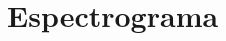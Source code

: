 \documentclass[assd_tp2_main.tex]{subfiles}
\begin{document}
\section{Espectrograma}
\end{document}
